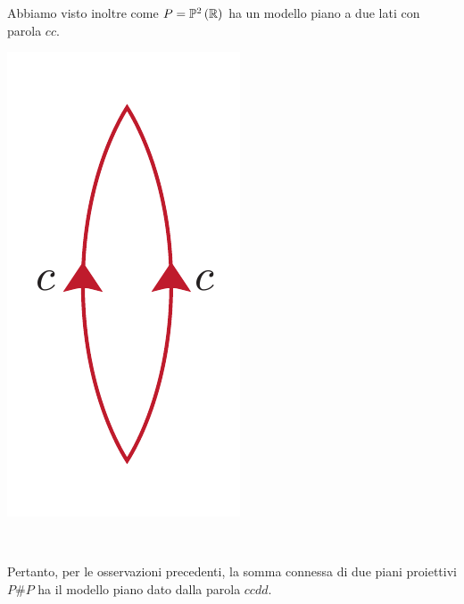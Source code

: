 \begin{observe}
\begin{minipage}{.75\linewidth}
	Abbiamo visto inoltre come $P=\proj[2]{\realset}$ ha un modello piano a due lati con parola $cc$.
\end{minipage}
\begin{minipage}{.24\linewidth}
	\begin{center}
		\includegraphics[trim=0cm 0cm 0cm 0cm, clip, scale=0.3]{images/proj2lines.pdf}
	\end{center}
\end{minipage}\\
	\begin{minipage}{.75\linewidth}
	Pertanto, per le osservazioni precedenti, la somma connessa di due piani proiettivi $P\# P$ ha il modello piano dato dalla parola $ccdd$.
\end{minipage}
\begin{minipage}{.24\linewidth}
	\begin{center}

\end{center}
\end{minipage}
\end{observe}
